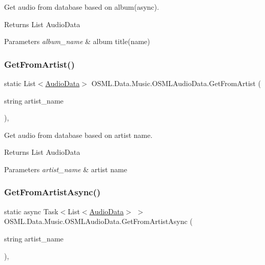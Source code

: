 Get audio from database based on album(async). 

\begin{DoxyReturn}{Returns}
List Audio\+Data 
\end{DoxyReturn}

\begin{DoxyParams}{Parameters}
{\em album\+\_\+name} & album title(name)\\
\hline
\end{DoxyParams}
\mbox{\label{classOSML_1_1Data_1_1Music_1_1OSMLAudioData_a44522dff16b681e2649f37e135dc1de1}} 
\subsubsection{\texorpdfstring{GetFromArtist()}{GetFromArtist()}}
{\footnotesize\ttfamily static List$<$\mbox{\hyperlink{classOSML_1_1Media_1_1AudioData}{Audio\+Data}}$>$ O\+S\+M\+L.\+Data.\+Music.\+O\+S\+M\+L\+Audio\+Data.\+Get\+From\+Artist (\begin{DoxyParamCaption}\item[{string}]{artist\+\_\+name }\end{DoxyParamCaption})\hspace{0.3cm}{\ttfamily [inline]}, {\ttfamily [static]}}



Get audio from database based on artist name. 

\begin{DoxyReturn}{Returns}
List Audio\+Data 
\end{DoxyReturn}

\begin{DoxyParams}{Parameters}
{\em artist\+\_\+name} & artist name\\
\hline
\end{DoxyParams}
\mbox{\label{classOSML_1_1Data_1_1Music_1_1OSMLAudioData_ad4f7e4ba9f63728ebc6203ebbc191022}} 
\subsubsection{\texorpdfstring{GetFromArtistAsync()}{GetFromArtistAsync()}}
{\footnotesize\ttfamily static async Task$<$List$<$\mbox{\hyperlink{classOSML_1_1Media_1_1AudioData}{Audio\+Data}}$>$ $>$ O\+S\+M\+L.\+Data.\+Music.\+O\+S\+M\+L\+Audio\+Data.\+Get\+From\+Artist\+Async (\begin{DoxyParamCaption}\item[{string}]{artist\+\_\+name }\end{DoxyParamCaption})\hspace{0.3cm}{\ttfamily [inline]}, {\ttfamily [static]}}



